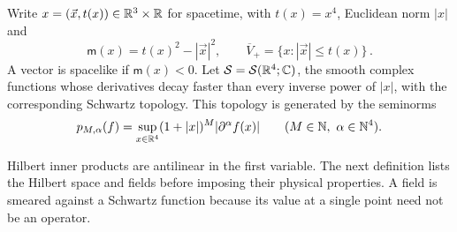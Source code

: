 \begin{definition}\label{def:spacetime}
Write $x=(\vec x,t(x))\in\mathbb R^3\times\mathbb R$ for spacetime, with $t(x)=x^4$, Euclidean norm $|x|$ and
\begin{equation}\label{eq:spacetime}
\mathsf m(x)=t(x)^2-|\vec x|^2,
\qquad \overline V_+=\{x:|\vec x|\le t(x)\}\,.
\end{equation}
A vector is spacelike if $\mathsf m(x)<0$.
Let $\mathcal S=\mathcal S(\mathbb R^4;\mathbb C)$, the smooth complex functions whose derivatives decay faster than every inverse power of $|x|$, with the corresponding Schwartz topology.
This topology is generated by the seminorms
\begin{equation*}
 p_{M,\alpha}(f)=\sup_{x\in\mathbb R^4}(1+|x|)^M|\partial^\alpha f(x)|
 \qquad(M\in\mathbb N,\ \alpha\in\mathbb N^4).
\end{equation*}
\end{definition}

Hilbert inner products are antilinear in the first variable.
The next definition lists the Hilbert space and fields before imposing their physical properties.
A field is smeared against a Schwartz function because its value at a single point need not be an operator.

